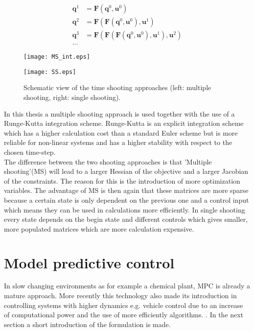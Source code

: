 \begin{enumerate}
	\begin{equation}\label{eq:2}
	\begin{aligned}
	\bm{q}^1 &= \bm{F}(\bm{q}^0, \bm{u}^0)\\
	\bm{q}^2 &= \bm{F}(\bm{F}(\bm{q}^0, \bm{u}^0), \bm{u}^1)\\
	\bm{q}^3 &= \bm{F}(\bm{F}(\bm{F}(\bm{q}^0, \bm{u}^0), \bm{u}^1), \bm{u}^2)\\
	...
	\end{aligned}
	\end{equation}
\end{enumerate}

\begin{figure}[htp]
	\centering
	\begin{minipage}{0.49\textwidth}
		\centering
		\texttt{[image: MS\_int.eps]}
	\end{minipage}
	\hfill
	\begin{minipage}{.49\textwidth}
		\centering
		\texttt{[image: SS.eps]}
	\end{minipage}
	\caption{Schematic view of the time shooting approaches (left: multiple shooting, right: single shooting).}
	\label{fig:TS}
\end{figure}

In this thesis a multiple shooting approach is used together with the use of a Runge-Kutta integration scheme. Runge-Kutta is an explicit integration scheme which has a higher calculation cost than a standard Euler scheme but is more reliable for non-linear systems and has a higher stability with respect to the chosen time-step. \cite{Mercy2018}  \\ 

The difference between the two shooting approaches is that 'Multiple shooting'(MS) will lead to a larger Hessian of the objective and a larger Jacobian of the constraints. The reason for this is the introduction of more optimization variables. The advantage of MS is then again that these matrices are more sparse because a certain state is only dependent on the previous one and a control input which means they can be used in calculations more efficiently. In single shooting every state depends on the begin state and different controls which gives smaller, more populated matrices which are more calculation expensive. \cite{Gillis2019}

\section{Model predictive control}
\label{s:MPC_e}
In slow changing environments as for example a chemical plant, MPC is already a mature approach. More recently this technology also made its introduction in controlling systems with higher dynamics e.g. vehicle control due to an increase of computational power and the use of more efficiently algorithms. \cite{Mercy2018}. In the next section a short introduction of the formulation is made. \\

